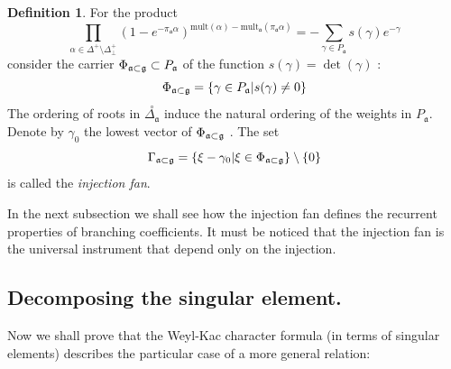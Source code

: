 \documentclass[12pt]{iopart}
\theoremstyle{definition}
\newtheorem{definition}{Definition}
\newcommand{\co}[1]{\stackrel{\circ }{#1}}
\newcommand{\af}{\mathfrak{a}}
\begin{document}
\begin{definition}
\label{fan-definition} For the product
\begin{equation}
\prod_{\alpha \in \Delta ^{+}\setminus \Delta _{\bot }^{+}}\left( 1-e^{-\pi
_{\af}\alpha }\right) ^{\mathrm{mult}(\alpha )-\mathrm{mult}_{\af%
}(\pi _{\af}\alpha )}=-\sum_{\gamma \in P_{\af}}s(\gamma
)e^{-\gamma }  \label{eq:6}
\end{equation}
consider the carrier $\Phi _{\af\subset \frak{g}}\subset P_{\af}$
of the function $s(\gamma )=\det \left( \gamma \right) $ :
\begin{equation}
\Phi _{\af\subset \frak{g}}=\left\{ \gamma \in P_{\af}|s(\gamma
)\neq 0\right\}   \label{eq:37}
\end{equation}
The ordering of roots in $\co{\Delta _{\af}}$ induce the
natural ordering of the weights in $P_{\af}$. Denote by $\gamma _{0}$
the lowest vector of $\Phi _{\af\subset \frak{g}}$ . The set
\begin{equation}
\Gamma _{\af\subset \frak{g}}=\left\{ \xi -\gamma _{0}|\xi \in \Phi _{%
\af\subset \frak{g}}\right\} \setminus \left\{ 0\right\}
\label{fan-defined}
\end{equation}
is called the \textit{injection fan}.
\end{definition}
In the next subsection we shall see how the injection fan defines the recurrent
properties of branching coefficients. It must be noticed that the injection fan is
the universal instrument that depend only on the injection.

\subsection{Decomposing the singular element.}
\label{subsec:decomp-sing-element}

Now we shall prove that the Weyl-Kac character formula (in terms of singular
elements) describes the particular case of a more general relation:
\end{document}
